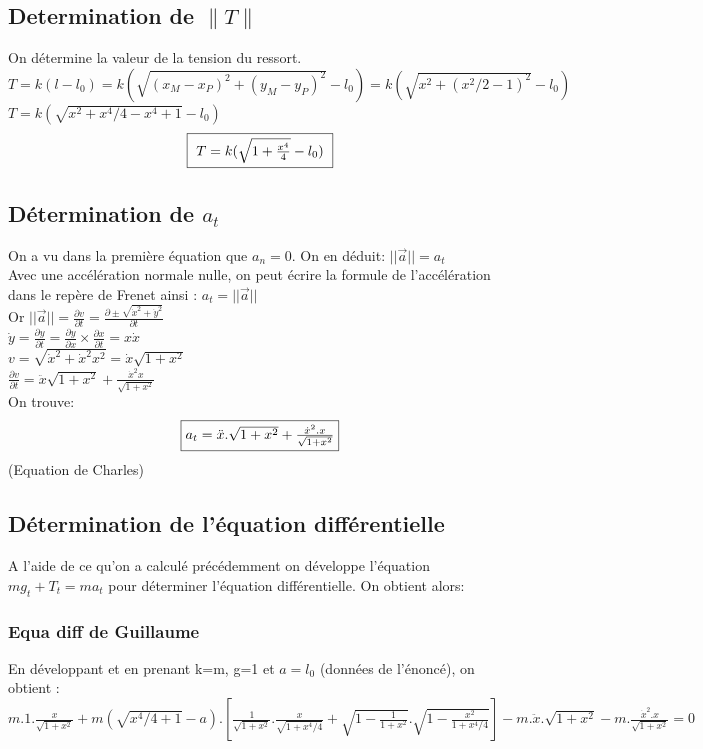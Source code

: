 \documentclass[10pt,a4paper]{article}
\begin{document}
\subsection{Determination de $ \|T\| $}
On détermine la valeur de la tension du ressort.\\
$T=k(l-l_0)=k(\sqrt{(x_M-x_P)^2+(y_M-y_P)^2}-l_0)=k(\sqrt{x^2+(x^2/2-1)^2}-l_0)$\\
$T=k(\sqrt{x^2+x^4/4-x^4+1}-l_0)$\\
\[\fbox{ $T=k(\sqrt{1+\frac{x^4}{4}}-l_0)$ }\]

\subsection{Détermination de $a_t$}
On a vu dans la première équation que $a_n=0$. On en déduit: $||\vec{a}||=a_t$\\
Avec une accélération normale nulle, on peut écrire la formule de l'accélération dans le repère de Frenet ainsi : $a_t=||\vec{a}||$\\ %
Or $||\vec{a}||=\frac{\partial v}{\partial t}=\frac{\partial \pm\sqrt{\dot{x}^2+\dot{y}^2}}{\partial t}$\\
$ \dot{y}=\frac{\partial y}{\partial t}=\frac{\partial y}{\partial x}\times\frac{\partial x}{\partial t}=x\dot{x} $\\
$ v=\sqrt{\dot{x}^2+\dot{x}^2x^2}=\dot{x}\sqrt{1+x^2} $\\
$ \frac{\partial v}{\partial t}=\ddot{x}\sqrt{1+x^2}+\frac{\dot{x}^2x}{\sqrt{1+x^2}} $\\
On trouve: \[\fbox{$a_t=\ddot{x}.\sqrt{1+x^2}+ \frac{\dot{x}^2.x}{\sqrt{1+x^2}}$}\] (Equation de Charles)

\subsection{Détermination de l'équation différentielle}
A l'aide de ce qu'on a calculé précédemment on développe l'équation $mg_t+T_t=ma_t$ pour déterminer l'équation différentielle.
On obtient alors: 
\subsubsection{Equa diff de Guillaume}
En développant et en prenant k=m, g=1 et $a=l_0$ (données de l'énoncé), on obtient :\\
$m.1.\frac{x}{\sqrt{1+x^2}} + m(\sqrt{x^4/4+1}-a).[\frac{1}{\sqrt{1+x^2}}.\frac{x}{\sqrt{1+x^4/4}} + \sqrt{1-\frac{1}{1+x^2}}.\sqrt{1-\frac{x^2}{1+x^4/4}}] - m.\ddot{x}.\sqrt{1+x^2} - m.\frac{\dot{x}^2.x}{\sqrt{1+x^2}} = 0$ \\
 
\end{document}
